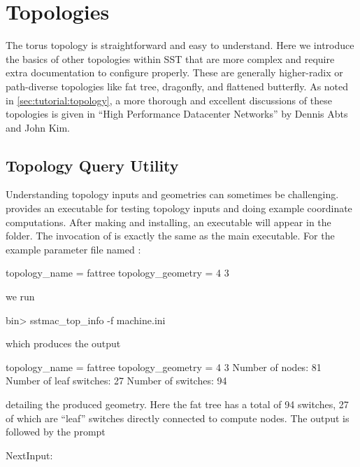 
\chapter{Topologies}
\label{chapter:topologies}


The torus topology is straightforward and easy to understand.
Here we introduce the basics of other topologies within SST that are more complex and require extra documentation to configure properly.
These are generally higher-radix or path-diverse topologies like fat tree, dragonfly, and flattened butterfly.  
As noted in \ref{sec:tutorial:topology}, a more thorough and excellent discussions of these topologies is given in ``High Performance Datacenter Networks'' by Dennis Abts and John Kim.

\section{Topology Query Utility}
Understanding topology inputs and geometries can sometimes be challenging.
\sstmacro provides an executable for testing topology inputs and doing example coordinate computations.
After making and installing, an executable  will appear in the  folder.
The invocation of  is exactly the same as the main  executable.
For the example parameter file named :

\begin{ViFile}
topology_name = fattree
topology_geometry = 4 3
\end{ViFile}

we run

\begin{ShellCmd}
bin> sstmac_top_info -f machine.ini
\end{ShellCmd}
which produces the output

\begin{ViFile}
topology_name             = fattree
topology_geometry         = 4 3
Number of nodes:         81
Number of leaf switches: 27
Number of switches:      94
\end{ViFile}

detailing the produced geometry.  Here the fat tree has a total of 94 switches, 27 of which are ``leaf'' switches directly connected to compute nodes.
The output is followed by the prompt

\begin{ShellCmd}
NextInput: 
\end{ShellCmd}

